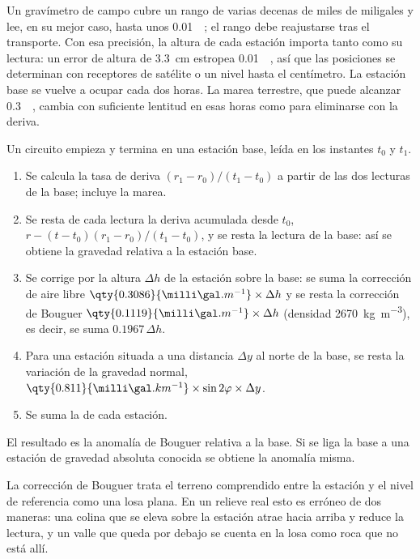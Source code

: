 Un gravímetro de campo cubre un rango de varias decenas de miles de
miligales y lee, en su mejor caso, hasta unos \qty{0.01}{\milli\gal}; el
rango debe reajustarse tras el transporte. Con esa precisión, la altura de
cada estación importa tanto como su lectura: un error de altura de \qty{3.3}{cm}
estropea \qty{0.01}{\milli\gal}, así que las posiciones se determinan con
receptores de satélite o un nivel hasta el centímetro. La estación base se
vuelve a ocupar cada dos horas. La marea terrestre, que puede alcanzar
\qty{0.3}{\milli\gal}, cambia con suficiente lentitud en esas horas como para
eliminarse con la deriva.

\begin{method}\label{met:b3:field-lab-methods-3:loop}
Un circuito empieza y termina en una estación base, leída en los instantes $t_0$ y $t_1$.
\begin{enumerate}
  \item Se calcula la tasa de deriva $(r_1 - r_0)/(t_1 - t_0)$ a partir de las dos
        lecturas de la base; incluye la marea.
  \item Se resta de cada lectura la deriva acumulada desde $t_0$,
        $r - (t - t_0)(r_1 - r_0)/(t_1 - t_0)$, y se resta la lectura
        de la base: así se obtiene la gravedad relativa a la estación base.
  \item Se corrige por la altura $\Delta h$ de la estación sobre la base:
        se suma la corrección de aire libre $\qty{0.3086}{\milli\gal.m^{-1}}
        \times\Delta h$ y se resta la corrección de Bouguer
        $\qty{0.1119}{\milli\gal.m^{-1}}\times\Delta h$ (densidad
        \qty{2670}{kg.m^{-3}}), es decir, se suma $0.1967\,\Delta h$.
  \item Para una estación situada a una distancia $\Delta y$ al norte de la base, se resta
        la variación de la gravedad normal, $\qty{0.811}{\milli\gal.km^{-1}}
        \times\sin 2\varphi\times\Delta y$.
  \item Se suma la  de cada estación.
\end{enumerate}
El resultado es la anomalía de Bouguer relativa a la base. Si se liga la base
a una estación de gravedad absoluta conocida se obtiene la anomalía misma.
\end{method}

La corrección de Bouguer trata el terreno comprendido entre la estación y el
nivel de referencia como una losa plana. En un relieve real esto es erróneo de dos maneras:
una colina que se eleva sobre la estación atrae hacia arriba y reduce la
lectura, y un valle que queda por debajo se cuenta en la losa como
roca que no está allí.


